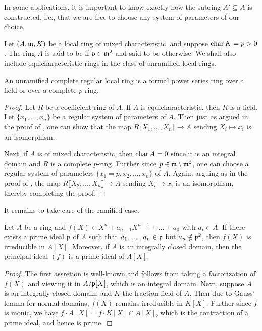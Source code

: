 \begin{remark}
    In some applications, it is important to know exactly how the subring $A'\subseteq A$ is constructed, i.e., that we are free to choose any system of parameters of our choice. 
\end{remark}

\begin{definition}
    Let $(A,\mathfrak{m}, K)$ be a local ring of mixed characteristic, and suppose $\operatorname{char} K = p > 0$. The ring $A$ is said to be  if $p\in\mathfrak{m}^2$ and said to be  otherwise. We shall also include equicharacteristic rings in the class of unramified local rings.
\end{definition}

\begin{theorem}
    An unramified complete regular local ring is a formal power series ring over a field or over a complete $p$-ring.
\end{theorem}
\begin{proof}
    Let $R$ be a coefficient ring of $A$. If $A$ is equicharacteristic, then $R$ is a field. Let $\{x_1,\dots,x_n\}$ be a regular system of parameters of $A$. Then just as argued in the proof of , one can show that the map $R\llbracket X_1,\dots, X_n\rrbracket\to A$ sending $X_i\mapsto x_i$ is an isomorphism. 

    Next, if $A$ is of mixed characteristic, then $\operatorname{char} A = 0$ since it is an integral domain and $R$ is a complete $p$-ring. Further since $p\in\mathfrak{m}\setminus\mathfrak{m}^2$, one can choose a regular system of parameters $\{x_1 = p, x_2,\dots,x_n\}$ of $A$. Again, arguing as in the proof of , the map $R\llbracket X_2,\dots,X_n\rrbracket\to A$ sending $X_i\mapsto x_i$ is an isomorphism, thereby completing the proof.
\end{proof}

It remains to take care of the ramified case. 

\begin{lemma}[Eisenstein]
    Let $A$ be a ring and $f(X)\in X^n + a_{n - 1}X^{n - 1} + \dots + a_0$ with $a_i\in A$. If there exists a prime ideal $\mathfrak{p}$ of $A$ such that $a_1,\dots,a_n\in\mathfrak{p}$ but $a_n\notin\mathfrak{p}^2$, then $f(X)$ is irreducible in $A[X]$. Moreover, if $A$ is an integrally closed domain, then the principal ideal $(f)$ is a prime ideal of $A[X]$.
\end{lemma}
\begin{proof}
    The first assretion is well-known and follows from taking a factorization of $f(X)$ and viewing it in $A/\mathfrak{p}[X]$, which is an integral domain. Next, suppose $A$ is an integrally closed domain, and $K$ the fraction field of $A$. Then due to Gauss' lemma for normal domains, $f(X)$ remains irreducible in $K[X]$. Further since $f$ is monic, we have $f\cdot A[X] = f\cdot K[X]\cap A[X]$, which is the contraction of a prime ideal, and hence is prime.
\end{proof}

